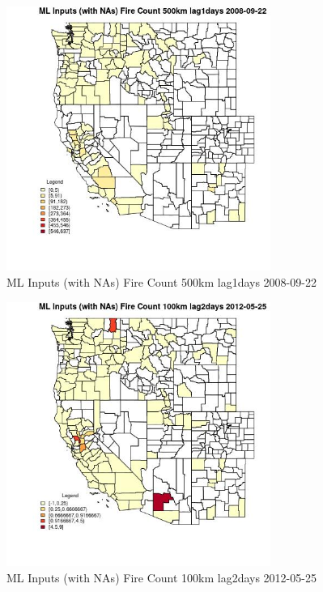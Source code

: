 \begin{figure} 
\centering  
\includegraphics[width=0.77\textwidth]{Code_Outputs/Report_ML_input_PM25_Step4_part_e_de_duplicated_aves_compiled_2019-05-18wNAs_CountyFire_Count_500km_lag1daysMean2008-09-22.jpg} 
\caption{\label{fig:Report_ML_input_PM25_Step4_part_e_de_duplicated_aves_compiled_2019-05-18wNAsCountyFire_Count_500km_lag1daysMean2008-09-22}ML Inputs (with NAs) Fire Count 500km lag1days 2008-09-22} 
\end{figure} 
 

\clearpage 

\begin{figure} 
\centering  
\includegraphics[width=0.77\textwidth]{Code_Outputs/Report_ML_input_PM25_Step4_part_e_de_duplicated_aves_compiled_2019-05-18wNAs_CountyFire_Count_100km_lag2daysMean2012-05-25.jpg} 
\caption{\label{fig:Report_ML_input_PM25_Step4_part_e_de_duplicated_aves_compiled_2019-05-18wNAsCountyFire_Count_100km_lag2daysMean2012-05-25}ML Inputs (with NAs) Fire Count 100km lag2days 2012-05-25} 
\end{figure} 
 

